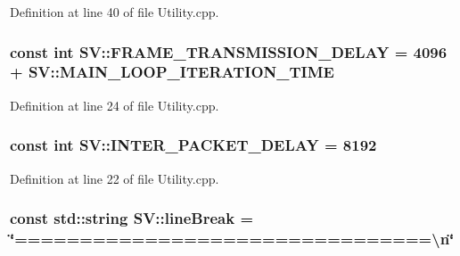Definition at line 40 of file Utility.\-cpp.

\hypertarget{namespace_s_v_a91d9ea38d5f6a4803e3e94ad8c9a722a}{
\subsubsection[{F\-R\-A\-M\-E\-\_\-\-T\-R\-A\-N\-S\-M\-I\-S\-S\-I\-O\-N\-\_\-\-D\-E\-L\-A\-Y}]{\setlength{\rightskip}{0pt plus 5cm}const int S\-V\-::\-F\-R\-A\-M\-E\-\_\-\-T\-R\-A\-N\-S\-M\-I\-S\-S\-I\-O\-N\-\_\-\-D\-E\-L\-A\-Y = 4096 + {\bf S\-V\-::\-M\-A\-I\-N\-\_\-\-L\-O\-O\-P\-\_\-\-I\-T\-E\-R\-A\-T\-I\-O\-N\-\_\-\-T\-I\-M\-E}}}\label{namespace_s_v_a91d9ea38d5f6a4803e3e94ad8c9a722a}


Definition at line 24 of file Utility.\-cpp.

\hypertarget{namespace_s_v_aa245d3d1f71d5a419cefdc42626b1c07}{
\subsubsection[{I\-N\-T\-E\-R\-\_\-\-P\-A\-C\-K\-E\-T\-\_\-\-D\-E\-L\-A\-Y}]{\setlength{\rightskip}{0pt plus 5cm}const int S\-V\-::\-I\-N\-T\-E\-R\-\_\-\-P\-A\-C\-K\-E\-T\-\_\-\-D\-E\-L\-A\-Y = 8192}}\label{namespace_s_v_aa245d3d1f71d5a419cefdc42626b1c07}


Definition at line 22 of file Utility.\-cpp.

\hypertarget{namespace_s_v_aa04b6739e3012b22c033d003c26d5584}{
\subsubsection[{line\-Break}]{\setlength{\rightskip}{0pt plus 5cm}const std\-::string S\-V\-::line\-Break = \char`\"{}================================\textbackslash{}n\char`\"{}}}\label{namespace_s_v_aa04b6739e3012b22c033d003c26d5584}



